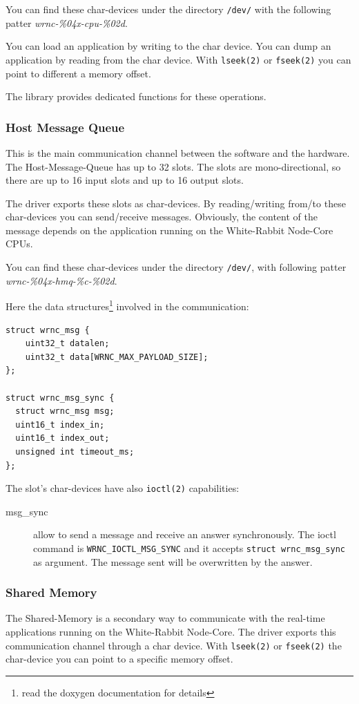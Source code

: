 \documentclass[a4paper,10pt]{article}
\begin{document}
You can find these char-devices under the directory \texttt{/dev/} 
with the following patter \textit{wrnc-\%04x-cpu-\%02d}.

You can load an application by writing to the char device. You can
dump an application by reading from the char device. With
\texttt{lseek(2)} or \texttt{fseek(2)} you can point to different
a memory offset.

The library provides dedicated functions for these operations.


\subsubsection{Host Message Queue}%
This is the main communication channel between the software and the
hardware. The Host-Message-Queue has up to 32 slots. The slots are
mono-directional, so there are up to 16 input slots and up to 16
output slots.

The driver exports these slots as char-devices. By reading/writing
from/to these char-devices you can send/receive messages. Obviously,
the content of the message depends on the application running on the
White-Rabbit Node-Core CPUs.

You can find these char-devices under the directory \texttt{/dev/}, 
with following patter \textit{wrnc-\%04x-hmq-\%c-\%02d}.

Here the data structures\footnote{read the doxygen 
documentation for details} involved in the communication:

\begin{lstlisting}
struct wrnc_msg {
	uint32_t datalen;
	uint32_t data[WRNC_MAX_PAYLOAD_SIZE];
};

struct wrnc_msg_sync {
  struct wrnc_msg msg;
  uint16_t index_in;
  uint16_t index_out;
  unsigned int timeout_ms;
};
\end{lstlisting}

The slot's char-devices have also \texttt{ioctl(2)} capabilities:
\begin{description}
  \item[msg\_sync] allow to send a message and receive an answer
    synchronously. The ioctl command is \texttt{WRNC\_IOCTL\_MSG\_SYNC}
    and it accepts \texttt{struct wrnc\_msg\_sync} as argument. The
    message sent will be overwritten by the answer.
\end{description}

\subsubsection{Shared Memory}%
The Shared-Memory is a secondary way to communicate with the real-time
applications running on the White-Rabbit Node-Core. The driver exports
this communication channel through a char device. With \texttt{lseek(2)}
or \texttt{fseek(2)} the char-device you can point to a specific
memory offset.
\end{document}

